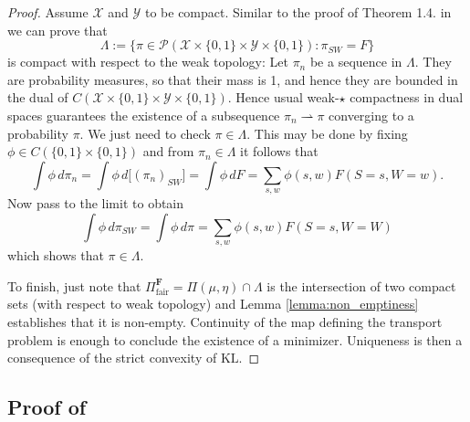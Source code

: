 \documentclass{article}
\theoremstyle{definition}
\begin{document}
\begin{proof} Assume $\mathcal{X}$ and $\mathcal{Y}$ to be compact. Similar to the proof of Theorem 1.4. in \cite{santambrogio2015optimal} we can prove that \[\Lambda:=\big\lbrace \pi \in \mathcal{P}(\mathcal{X}\times \lbrace 0,1\rbrace \times \mathcal{Y}\times  \lbrace 0,1\rbrace): \pi_{SW}=F\big\rbrace \]
is compact with respect to the weak topology: Let $\pi_n$ be a sequence in $\Lambda$. They are probability measures, so that their mass is 1, and hence they are bounded in the dual of $C(\mathcal{X}\times \lbrace 0,1\rbrace\times \mathcal{Y}\times \lbrace 0,1\rbrace)$. Hence usual weak-$\star$ compactness in dual spaces guarantees the existence of a subsequence $\pi_n \rightharpoonup \pi$ converging to a probability $\pi$. We just need to check $\pi \in \Lambda$. This
may be done by fixing $\phi\in C(\lbrace 0,1\rbrace \times \lbrace 0,1\rbrace)$ and from $\pi_n\in \Lambda$ it follows that 
\[\int \phi \, d\pi_n=\int \phi \, d
\big[(\pi_n)_{SW}\big]=\int \phi \, d F=\sum_{s,w}\phi(s,w)F(S=s,W=w).\]
Now pass to the limit to obtain
$$\int \phi \, d\pi_{SW}=\int \phi\, d\pi=\sum_{s,w}\phi(s,w)F(S=s,W=W)$$
which shows that $\pi\in \Lambda$.

To finish, just note that $\Pi_{\text{fair}}^{\mathbf{F}}=\Pi(\mu,\eta) \cap \Lambda$ is the  intersection of two compact sets (with respect to weak topology) and  Lemma \ref{lemma:non_emptiness} establishes that it is non-empty. Continuity of the map defining the transport problem is enough to conclude the existence of a minimizer. Uniqueness is then a consequence of the strict convexity of $\text{KL}$.
    \end{proof}
\subsection{Proof of~}\label{app:sample-complexity}
\end{document}
